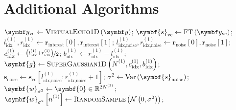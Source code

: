 \clearpage
\section{Additional Algorithms}

\begin{algorithm}[h!]
    \begin{algorithmic}[1]
        \caption[
            Filtering procedure for 1D data.
        ]
        {
            Filtering procedure for 1D data.
            $\symbf{r}_{\text{interest}}$ is a vector of length 2 containing
            the indices of the left and right bounds of the region of interest.
            These would typically be provided in units of \unit{\hertz} or
            \unit{\partspermillion} by a user. Conversion to array indices can
            be carried out using \eqref{eq:fidx}.
            $\symbf{r}_{\text{noise}}$ contains the left and right bounds of
            the region used to estimate the noise variance.
            \textsc{RandomSample} indicates taking a random sample from the
            given distribution.
        }
        \label{alg:filter-1d}
            \State $\by_{\text{ve}} \gets \textsc{VirtualEcho$1$D}\left(\by\right)$;
            \State $\symbf{s}_{\text{ve}} \gets \FT\left(\by_{\text{ve}}\right)$;
            \State $l^{(1)}_{\text{idx}}, r^{(1)}_{\text{idx}} \gets \symbf{r}_{\text{interest}}[0], \symbf{r}_{\text{interest}}[1]$;
            \State $l^{(1)}_{\text{idx,noise}}, r^{(1)}_{\text{idx,noise}} \gets \symbf{r}_{\text{noise}}[0], \symbf{r}_{\text{noise}}[1]$;
            \State $c_{\text{idx}}^{(1)} \gets \nicefrac{\left(l_{\text{idx}}^{(1)} + r_{\text{idx}}^{(1)}\right)}{2}$;
            \State $b_{\text{idx}}^{(1)} \gets r_{\text{idx}}^{(1)} - l_{\text{idx}}^{(1)}$;
            \State $\symbf{g} \gets \textsc{SuperGaussian$1$D}\left(\None_{\vphantom{\text{idx}}}, c_{\text{idx}}^{(1)}, b_{\text{idx}}^{(1)}\right)$;
            \State $\symbf{s}_{\text{noise}} \gets \symbf{s}_{\text{ve}} \left[
                l^{(1)}_{\text{idx,noise}} : r^{(1)}_{\text{idx,noise}} + 1
            \right]
            $;
            \State $\sigma^2 \gets \Var\left(\symbf{s}_{\text{noise}}\right)$;
            \State $\symbf{w}_{\sigma^2} \gets \symbf{0} \in \mathbb{R}^{2\None}$;
                \State $\symbf{w}_{\sigma^2}\left[ \none \right] \gets \textsc{RandomSample}\left(\mathcal{N}\left(0, \sigma^2\right)\right)$;

\end{algorithmic}
\end{algorithm}
